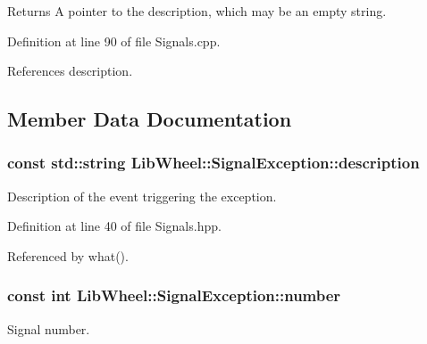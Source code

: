 \begin{DoxyReturn}{\-Returns}
\-A pointer to the description, which may be an empty string. 
\end{DoxyReturn}


\-Definition at line 90 of file \-Signals.\-cpp.



\-References description.



\subsection{\-Member \-Data \-Documentation}
\hypertarget{classLibWheel_1_1SignalException_a859cd244b034ef6514d695d233463049}{
\subsubsection[{description}]{\setlength{\rightskip}{0pt plus 5cm}const std\-::string {\bf \-Lib\-Wheel\-::\-Signal\-Exception\-::description}}}
\label{classLibWheel_1_1SignalException_a859cd244b034ef6514d695d233463049}


\-Description of the event triggering the exception. 



\-Definition at line 40 of file \-Signals.\-hpp.



\-Referenced by what().

\hypertarget{classLibWheel_1_1SignalException_a252b673e5b01bd416b2edbe38eeaac28}{
\subsubsection[{number}]{\setlength{\rightskip}{0pt plus 5cm}const int {\bf \-Lib\-Wheel\-::\-Signal\-Exception\-::number}}}
\label{classLibWheel_1_1SignalException_a252b673e5b01bd416b2edbe38eeaac28}


\-Signal number. 



